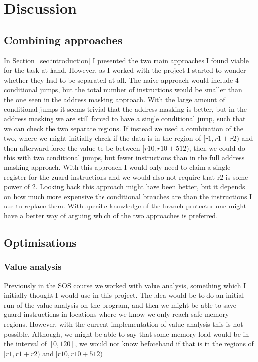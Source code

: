 \section{Discussion} \subsection{Combining approaches} In
Section~\ref{sec:introduction} I presented the two main approaches I found
viable for the task at hand. However, as I worked with the project I started to
wonder whether they had to be separated at all. The naive approach would
include 4 conditional jumps, but the total number of instructions would be
smaller than the one seen in the address masking approach. With the large
amount of conditional jumps it seems trivial that the address masking is
better, but in the address masking we are still forced to have a single
conditional jump, such that we can check the two separate regions. If instead
we used a combination of the two, where we might initially check if the data is
in the region of $[r1,r1 + r2)$ and then afterward force the value to be
between $[r10, r10 + 512)$, then we could do this with two conditional jumps,
but fewer instructions than in the full address masking approach. With this
approach I would only need to claim a single register for the guard
instructions and we would also not require that r2 is some power of 2. Looking
back this approach might have been better, but it depends on how much more
expensive the conditional branches are than the instructions I use to replace
them. With specific knowledge of the branch protector one might have a better
way of arguing which of the two approaches is preferred.

\subsection{Optimisations} \subsubsection{Value analysis} Previously in the SOS
course we worked with value analysis, something which I initially thought I
would use in this project. The idea would be to do an initial run of the value
analysis on the program, and then we might be able to save guard instructions
in locations where we know we only reach safe memory regions. However, with the
current implementation of value analysis this is not possible. Although, we
might be able to say that some memory load would be in the interval of $[0,
120]$, we would not know beforehand if that is in the regions of $[r1, r1+r2)$
and $[r10, r10+512)$

